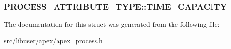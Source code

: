 \subsubsection[{\texorpdfstring{T\+I\+M\+E\+\_\+\+C\+A\+P\+A\+C\+I\+TY}{TIME_CAPACITY}}]{ P\+R\+O\+C\+E\+S\+S\+\_\+\+A\+T\+T\+R\+I\+B\+U\+T\+E\+\_\+\+T\+Y\+P\+E\+::\+T\+I\+M\+E\+\_\+\+C\+A\+P\+A\+C\+I\+TY}\hypertarget{structPROCESS__ATTRIBUTE__TYPE_aa3a2776010bcd8a9c21ea08013db926e}{}\label{structPROCESS__ATTRIBUTE__TYPE_aa3a2776010bcd8a9c21ea08013db926e}


The documentation for this struct was generated from the following file\+:\begin{DoxyCompactItemize}
\item 
src/libuser/apex/\hyperlink{apex__process_8h}{apex\+\_\+process.\+h}\end{DoxyCompactItemize}

